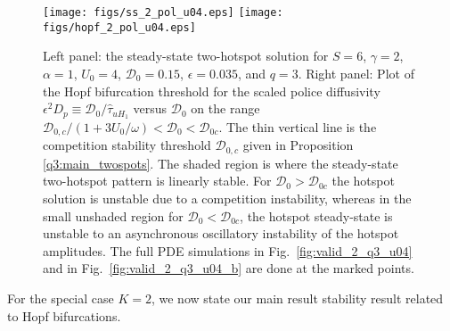 \documentclass{article}%
\begin{document}
\begin{figure}[htbp]
\centering
\texttt{[image: figs/ss\_2\_pol\_u04.eps]}
\texttt{[image: figs/hopf\_2\_pol\_u04.eps]}
\caption{\label{fig:hopf_pol_2} Left panel: the steady-state
  two-hotspot solution for $S=6$, $\gamma=2$, $\alpha=1$, $U_0=4$,
  ${\mathcal D}_0=0.15$, $\epsilon=0.035$, and $q=3$. Right panel:
  Plot of the Hopf bifurcation threshold for the scaled police
  diffusivity $\epsilon^{2}D_p\equiv {{\mathcal
      D}_0/\hat{\tau}_{uH_1}}$ versus ${\mathcal D}_0$ on the range
  ${{\mathcal D}_{0,c}/(1+{3U_0/\omega})} <{\mathcal D}_0<{\mathcal
    D}_{0c}$. The thin vertical line is the competition stability
  threshold ${\mathcal D}_{0,c}$ given in Proposition
  \ref{q3:main_twospots}. The shaded region is where the steady-state
  two-hotspot pattern is linearly stable. For ${\mathcal
    D}_0>{\mathcal D}_{0c}$ the hotspot solution is unstable due to a
  competition instability, whereas in the small unshaded region for
  ${\mathcal D}_0<{\mathcal D}_{0c}$, the hotspot steady-state is
  unstable to an asynchronous oscillatory instability of the hotspot
  amplitudes. The full PDE simulations in
  Fig.~\ref{fig:valid_2_q3_u04} and in Fig.~\ref{fig:valid_2_q3_u04_b}
  are done at the marked points.}
\end{figure}

\noindent For the special case $K=2$, we now state our main result stability
result related to Hopf bifurcations.
\end{document}
